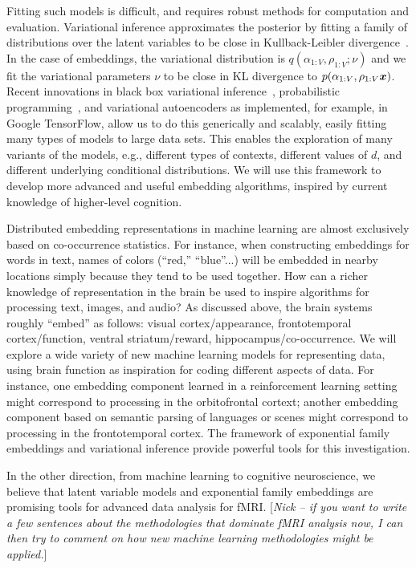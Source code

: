 Fitting such models is difficult, and requires robust methods for
computation and evaluation.  Variational inference approximates the
posterior by fitting a family of distributions over the latent
variables to be close in Kullback-Leibler
divergence~\citep{Jordan:1999,Blei:2017}.  In the case of embeddings,
the variational distribution is $q(\alpha_{1:V}, \rho_{1:V} ; \nu)$
and we fit the variational parameters $\nu$ to be close in KL
divergence to $p(\alpha_{1:V}, \rho_{1:V} \g \mbx)$.  Recent
innovations in black box variational inference~\citep{Ranganath:2014},
probabilistic programming~\citep{Kucukelbir:2017,Tran:2017}, and
variational autoencoders
\citep{kingma} as implemented, for example, in Google TensorFlow, allow us to do this generically and
scalably, easily fitting many types of models to large
data sets.  This enables the exploration of many variants of the
models, e.g., different types of contexts, different values of $d$,
and different underlying conditional distributions. We will use
this framework to develop more advanced and useful embedding
algorithms, inspired by current knowledge of higher-level cognition.


Distributed embedding representations in machine learning are almost
exclusively based on co-occurrence statistics. For instance, when
constructing embeddings for words in text, names of colors (``red,''
``blue''...) will be embedded in nearby locations simply because they
tend to be used together. How can a richer knowledge of representation
in the brain be used to inspire algorithms for processing text,
images, and audio? As discussed above, the brain systems roughly
``embed'' as follows: visual cortex/appearance, frontotemporal
cortex/function, ventral striatum/reward, hippocampus/co-occurrence.
We will explore a wide variety of new machine learning models 
for representing data, using brain function as inspiration
for coding different aspects of data. For instance,
one embedding component learned in a reinforcement learning
setting might correspond to processing in the orbitofrontal cortext;
another embedding component based on semantic parsing of 
languages or scenes might correspond to processing in
the frontotemporal cortex. 
The framework of exponential family embeddings and variational
inference provide powerful tools for this investigation.


In the other direction, from machine learning to cognitive
neuroscience, we believe that latent variable models and exponential family embeddings are
promising tools for advanced data analysis for fMRI.
[{\it Nick -- if you want to write a few sentences about the methodologies
that dominate fMRI analysis now, I can then try to comment on
how new machine learning methodologies might be applied.}]



